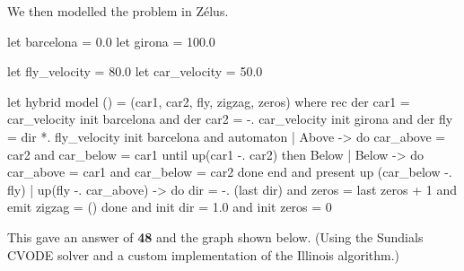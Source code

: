 \documentclass[a4paper]{article}
\begin{document}
We then modelled the problem in Zélus.
\begin{lst-zelus}{\footnotesize}
let barcelona = 0.0
let girona = 100.0

let fly_velocity = 80.0
let car_velocity = 50.0

let hybrid model () =  (car1, car2, fly, zigzag, zeros) where
  rec der car1 = car_velocity      init barcelona
  and der car2 = -. car_velocity init girona
  and der fly = dir *. fly_velocity init barcelona
  and automaton
        | Above ->
             do car_above = car2
             and car_below = car1
             until up(car1 -. car2) then Below
        | Below -> 
             do car_above = car1
             and car_below = car2
             done
        end
  and present 
         up (car_below -. fly) | up(fly -. car_above) -> 
           do
              dir = -. (last dir)
              and zeros = last zeros + 1
              and emit zigzag = ()
           done
  and init dir = 1.0
  and init zeros = 0
\end{lst-zelus}
This gave an answer of \textbf{48} and the graph shown below.
(Using the Sundials CVODE solver and a custom implementation of the Illinois 
algorithm.)

\begin{center}
\end{center}
\end{document}
